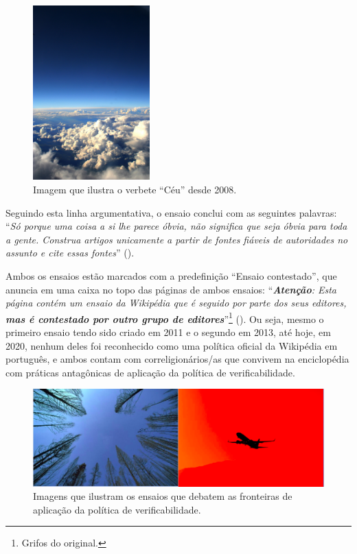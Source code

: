 \begin{figure}[H]
    \centering
    \includegraphics[width=0.4\textwidth]{Images/ceu.png}
    \caption{Imagem que ilustra o verbete “Céu” desde 2008.}
    \label{fig:ceu}
\end{figure}

Seguindo esta linha argumentativa, o ensaio conclui com as seguintes palavras: “\textit{Só porque uma coisa a si lhe parece óbvia, não significa que seja óbvia para toda a gente. Construa artigos unicamente a partir de fontes fiáveis de autoridades no assunto e cite essas fontes}” ().

Ambos os ensaios estão marcados com a predefinição ``Ensaio contestado'', que anuncia em uma caixa no topo das páginas de ambos ensaios: ``\textit{\textbf{Atenção}: Esta página contém um ensaio da Wikipédia que é seguido por parte dos seus editores, \textbf{mas é contestado por outro grupo de editores}}''\footnote{Grifos do original.} (). Ou seja, mesmo o primeiro ensaio tendo sido criado em 2011 e o segundo em 2013, até hoje, em 2020, nenhum deles foi reconhecido como uma política oficial da Wikipédia em português, e ambos contam com correligionários/as que convivem na enciclopédia com práticas antagônicas de aplicação da política de verificabilidade.

\begin{figure}[H]
    \centering
    \includegraphics[width=1\textwidth]{Images/ceus-verificabilidade.png}
    \caption{Imagens que ilustram os ensaios que debatem as fronteiras de aplicação da política de verificabilidade.}
    \label{fig:ceus-verificabilidade}
\end{figure}

